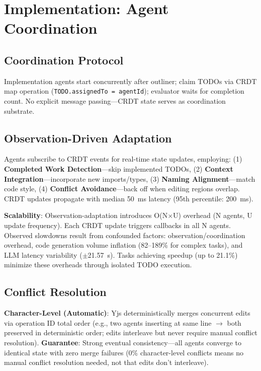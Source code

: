 \documentclass{article}
\begin{document}
\clearpage

\section{Implementation: Agent Coordination}
\label{sec:implementation}

\subsection{Coordination Protocol}

Implementation agents start concurrently after outliner; claim TODOs via CRDT map operation (\texttt{TODO.assignedTo = agentId}); evaluator waits for completion count. No explicit message passing---CRDT state serves as coordination substrate.

\subsection{Observation-Driven Adaptation}

Agents subscribe to CRDT events for real-time state updates, employing: (1) \textbf{Completed Work Detection}---skip implemented TODOs, (2) \textbf{Context Integration}---incorporate new imports/types, (3) \textbf{Naming Alignment}---match code style, (4) \textbf{Conflict Avoidance}---back off when editing regions overlap. CRDT updates propagate with median 50~ms latency (95th percentile: 200~ms).

\textbf{Scalability}: Observation-adaptation introduces O(N$\times$U) overhead (N agents, U update frequency). Each CRDT update triggers callbacks in all N agents. Observed slowdowns result from confounded factors: observation/coordination overhead, code generation volume inflation (82--189\% for complex tasks), and LLM latency variability ($\pm$21.57~s). Tasks achieving speedup (up to 21.1\%) minimize these overheads through isolated TODO execution.

\subsection{Conflict Resolution}

\textbf{Character-Level (Automatic)}: Yjs deterministically merges concurrent edits via operation ID total order (e.g., two agents inserting at same line $\rightarrow$ both preserved in deterministic order; edits interleave but never require manual conflict resolution). \textbf{Guarantee}: Strong eventual consistency---all agents converge to identical state with zero merge failures (0\% character-level conflicts means no manual conflict resolution needed, not that edits don't interleave).
\end{document}
